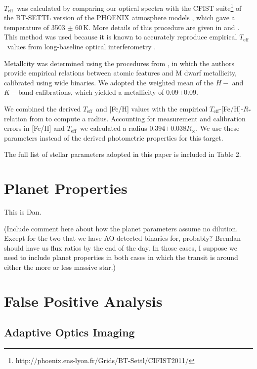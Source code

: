 \documentclass{emulateapj}
\newcommand\teff{\ensuremath{T_\text{eff}}}
\begin{document}
\teff\ was calculated by comparing our optical spectra with the CFIST
suite\footnote{http://phoenix.ens-lyon.fr/Grids/BT-Settl/CIFIST2011/} of the BT-SETTL
version of the PHOENIX atmosphere models \citep{Allard13}, which gave a temperature
of 3503 $\pm$ 60\,K. 
More details of this procedure are given in \citet{Mann14} and
\citet{Gaidos14}. 
This method was used because it is known to accurately reproduce empirical 
\teff\ values from long-baseline optical interferometry \citet{Boyajian12}. 

Metallcity was determined using the procedures from \citet{Mann13a}, in which the
authors provide empirical relations between atomic features and M dwarf
metallicity, calibrated using wide binaries. 
We adopted the weighted mean of the $H-$ and $K-$band calibrations, 
which yielded a metallicity of 0.09$\pm$0.09.

We combined the derived \teff\ and [Fe/H] values with the empirical 
\teff-[Fe/H]-$R_*$ relation from \citet{Mann15} to compute a radius. 
Accounting for measurement and calibration errors in [Fe/H] and \teff\ we calculated 
a radius 0.394$\pm0.038R_\odot$. 
We use these parameters instead of the derived photometric properties for this target.

The full list of stellar parameters adopted in this paper is included in
Table 2.

\section{Planet Properties}

This is Dan.

(Include comment here about how the planet parameters assume no dilution. 
Except for the two that we have AO detected binaries for, probably?
Brendan should have us flux ratios by the end of the day.
In those cases, I suppose we need to include planet properties in both cases
in which the transit is around either the more or less massive star.)

\section{False Positive Analysis}
\subsection{Adaptive Optics Imaging}
\end{document}
